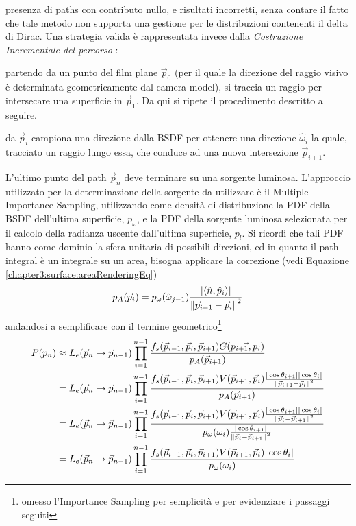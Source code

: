 presenza di paths con contributo nullo, e risultati incorretti, senza contare il fatto che tale metodo non supporta una gestione per le distribuzioni
contenenti il delta di Dirac. Una strategia valida \`e rappresentata invece dalla \textit{Costruzione Incrementale del percorso} \cite{pharr}:\par
partendo da un punto del film plane $\vec{p}_0$ (per il quale la direzione del raggio visivo \`e determinata geometricamente dal camera model),
si traccia un raggio per intersecare una superficie in $\vec{p}_1$. Da qui si ripete il procedimento descritto a seguire.\par
da $\vec{p}_i$ campiona una direzione dalla BSDF per ottenere una direzione $\hat{\omega}_i$ la quale, tracciato un raggio lungo essa, che conduce ad 
una nuova intersezione $\vec{p}_{i+1}$.\par
L'ultimo punto del path $\vec{p}_n$ deve terminare su una sorgente luminosa. L'approccio utilizzato per la determinazione della sorgente da utilizzare
\`e il Multiple Importance Sampling, utilizzando come densit\`a di distribuzione la PDF della BSDF dell'ultima superficie, $p_\omega$, e la PDF 
della sorgente luminosa selezionata per il calcolo della radianza uscente dall'ultima superficie, $p_l$. Si ricordi che tali PDF hanno come dominio
la sfera unitaria di possibili direzioni, ed 
in quanto il path integral \`e un integrale su un area, bisogna applicare la correzione (vedi Equazione \ref{chapter3:surface:areaRenderingEq})
\begin{equation}
	p_A(\vec{p}_i)=p_\omega(\hat{\omega}_{j-1})\frac{|\langle\hat{n},\hat{p}_i\rangle|}{\norm{\vec{p}_{i-1}-\vec{p}_i}^2}
\end{equation}
andandosi a semplificare con il termine geometrico\footnote{omesso l'Importance Sampling per semplicit\`a e per evidenziare i passaggi seguiti}
\begin{align}
	P(\bar{p}_n)&\approx L_e(\vec{p}_n\to\vec{p}_{n-1})\prod_{i=1}^{n-1}\frac{f_s(\vec{p}_{i-1},\vec{p}_i,\vec{p}_{i+1})G(\vec{p_{i+1},p_{i}})}
		{p_A(\vec{p}_{i+1})} \nonumber \\
	&=L_e(\vec{p}_n\to\vec{p}_{n-1})\prod_{i=1}^{n-1}\frac{f_s(\vec{p}_{i-1},\vec{p}_i,\vec{p}_{i+1})V(\vec{p}_{i+1},\vec{p}_i)
		\frac{|\cos\theta_{i+1}||\cos\theta_i|}{\norm{\vec{p}_{i+1}-\vec{p}_i}^2}}{p_A(\vec{p}_{i+1})} \nonumber \\
	&=L_e(\vec{p}_n\to\vec{p}_{n-1})\prod_{i=1}^{n-1}\frac{f_s(\vec{p}_{i-1},\vec{p}_i,\vec{p}_{i+1})V(\vec{p}_{i+1},\vec{p}_i)
		\frac{|\cos\theta_{i+1}||\cos\theta_i|}{\norm{\vec{p}_i-\vec{p}_{i+1}}^2}}
		{p_\omega(\omega_i)\frac{|\cos\theta_{i+1}|}{\norm{\vec{p}_i-\vec{p}_{i+1}}^2}} \nonumber \\
	&=L_e(\vec{p}_n\to\vec{p}_{n-1})\prod_{i=1}^{n-1}\frac{f_s(\vec{p}_{i-1},\vec{p}_i,\vec{p}_{i+1})V(\vec{p}_{i+1},\vec{p}_i)
		|\cos\theta_i|}{p_\omega(\omega_i)}
\end{align}
